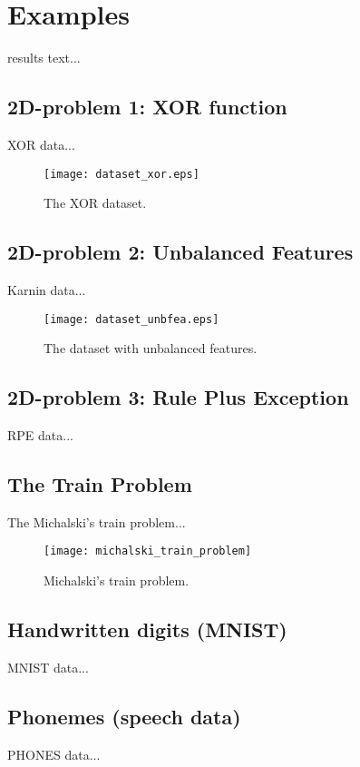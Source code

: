 \chapter{Examples} \label{chap:examples}
results text...

\section{2D-problem 1: XOR function} \label{sec:dataset_xor}
XOR data...

\begin{figure}[H]
\centering
\texttt{[image: dataset\_xor.eps]}
\caption{The XOR dataset.}
\label{fig:examples:dataset_xor}
\end{figure}

\section{2D-problem 2: Unbalanced Features} \label{sec:dataset_unbfea}
Karnin data...

\begin{figure}[H]
\centering
\texttt{[image: dataset\_unbfea.eps]}
\caption{The dataset with unbalanced features.}
\label{fig:examples:dataset_unbfea}
\end{figure}

\section{2D-problem 3: Rule Plus Exception} \label{sec:dataset_rpe}
RPE data...

\section{The Train Problem} \label{sec:dataset_train}
The Michalski's train problem...

\begin{figure}[H]
\centering
\texttt{[image: michalski\_train\_problem]}
\caption{Michalski's train problem.}
\label{fig:examples:dataset_train}
\end{figure}

\section{Handwritten digits (MNIST)} \label{sec:dataset_mnist}
MNIST data... \citep{online:mnist}

\section{Phonemes (speech data)} \label{sec:dataset_phonemes}
PHONES data...
